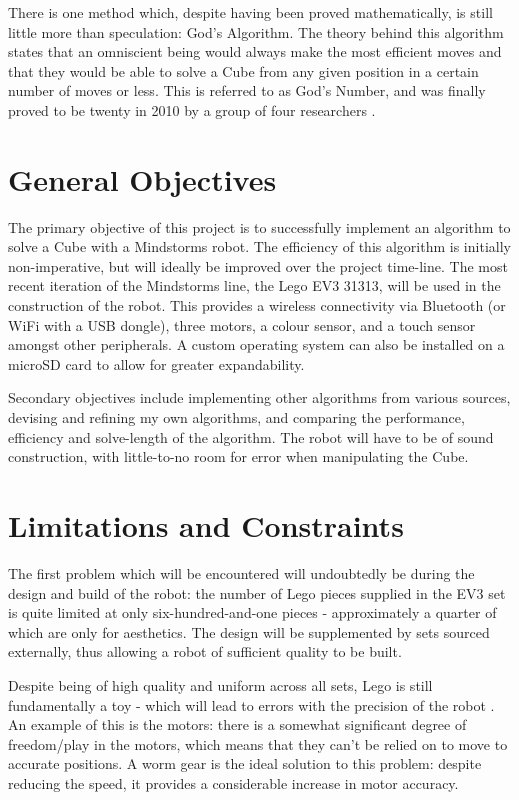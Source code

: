\documentclass{report}
\begin{document}
    There is one method which, despite having been proved mathematically, is still little more than speculation: God's Algorithm. The theory behind this algorithm states that an omniscient being would always make the most efficient moves and that they would be able to solve a Cube from any given position in a certain number of moves or less. This is referred to as God's Number, and was finally proved to be twenty in 2010 by a group of four researchers \cite{Rokicki2010}.
    
    \section{General Objectives}
    The primary objective of this project is to successfully implement an algorithm to solve a Cube with a Mindstorms robot. The efficiency of this algorithm is initially non-imperative, but will ideally be improved over the project time-line. The most recent iteration of the Mindstorms line, the Lego EV3 31313, will be used in the construction of the robot. This provides a wireless connectivity via Bluetooth (or WiFi with a USB dongle), three motors, a colour sensor, and a touch sensor amongst other peripherals. A custom operating system can also be installed on a microSD card to allow for greater expandability.
    
    Secondary objectives include implementing other algorithms from various sources, devising and refining my own algorithms, and comparing the performance, efficiency and solve-length of the algorithm. The robot will have to be of sound construction, with little-to-no room for error when manipulating the Cube.
    
    \section{Limitations and Constraints}
    The first problem which will be encountered will undoubtedly be during the design and build of the robot: the number of Lego pieces supplied in the EV3 set is quite limited at only six-hundred-and-one pieces - approximately a quarter of which are only for aesthetics. The design will be supplemented by sets sourced externally, thus allowing a robot of sufficient quality to be built.
    
    Despite being of high quality and uniform across all sets, Lego is still fundamentally a toy - which will lead to errors with the precision of the robot \cite{Cook2017}. An example of this is the motors: there is a somewhat significant degree of freedom/play in the motors, which means that they can't be relied on to move to accurate positions. A worm gear is the ideal solution to this problem: despite reducing the speed, it provides a considerable increase in motor accuracy.
    
\end{document}
